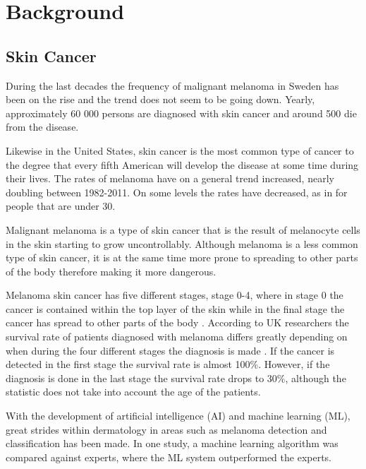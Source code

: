 \documentclass{kththesis}
\begin{document}
\chapter{Background}

\section{Skin Cancer}



During the last decades the frequency of malignant melanoma in Sweden has been on the rise and the trend does not seem to be going down. Yearly, approximately 60 000 persons are diagnosed with skin cancer and around 500 die from the disease. \parencite{sverige-hudcancer}

Likewise in the United States, skin cancer is the most common type of cancer to the degree that every fifth American will develop the disease at some time during their lives. The rates of melanoma have on a general trend increased, nearly doubling between 1982-2011. On some levels the rates have decreased, as in for people that are under 30. \parencite{aad-skin-cancer}

Malignant melanoma is a type of skin cancer that is the result of melano\-cyte cells in the skin starting to grow uncontrollably.
Although melanoma is a less common type of skin cancer, it is at the same time more prone to spreading to other parts of the body therefore making it more dangerous. \parencite{aad-skin-cancer}

Melanoma skin cancer has five different stages, stage 0-4, where in stage 0 the cancer is contained within the top layer of the skin while in the final stage the cancer has spread to other parts of the body \parencite{cancerresearchuk-melanoma}.
According to UK researchers the survival rate of patients diagnosed with melanoma differs greatly depending on when during the four different stages the diagnosis is made \parencite{cancerresearchuk-survival}.
If the cancer is detected in the first stage the survival rate is almost 100\%. However, if the diagnosis is done in the last stage the survival rate drops to 30\%, although the statistic does not take into account the age of the patients. \parencite{cancerresearchuk-survival}

With the development of artificial intelligence (AI) and machine learning (ML), great strides within dermatology in areas such as melanoma detection and classification has been made. In one study, a machine learning algorithm was compared against experts, where the ML system outperformed the experts. \parencite{8030303}
\end{document}

